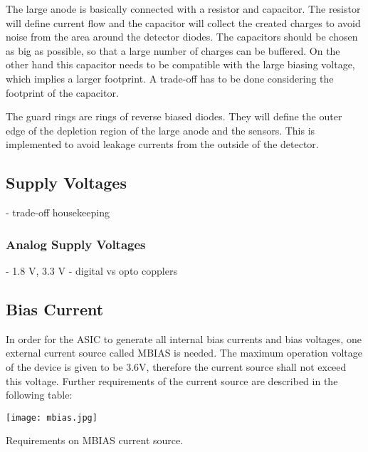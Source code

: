 The large anode is basically connected with a resistor and capacitor.
The resistor will define current flow and the capacitor will collect the created charges to avoid noise from the area around the detector diodes.
The capacitors should be chosen as big as possible, so that a large number of charges can be buffered.
On the other hand this capacitor needs to be compatible with the large biasing voltage, which implies a larger footprint.
A trade-off has to be done considering the footprint of the capacitor.

The guard rings are rings of reverse biased diodes.
They will define the outer edge of the depletion region of the large anode and the sensors.
This is implemented to avoid leakage currents from the outside of the detector.


\subsection{Supply Voltages}
\label{sec:power_supplies}
- trade-off housekeeping

\subsubsection{Analog Supply Voltages}
\label{sec:analog_supply}
- 1.8 V, 3.3 V
- digital vs opto copplers

\subsection{Bias Current}
\label{sec:bias_current}
In order for the ASIC to generate all internal bias currents and bias voltages, one external current source called MBIAS is needed.
The maximum operation voltage of the device is given to be 3.6V, therefore the current source shall not exceed this voltage.
Further requirements of the current source are described in the following table:\cite[p. 64-65]{Meier2016VATA466}
\begin{table}[H]
	\centering
    \texttt{[image: mbias.jpg]}
    \caption[MBIAS Parameters]{Requirements on MBIAS current source.\cite[p. 65, tab. 30]{Meier2016VATA466}}
	\label{tab:mbias}
\end{table}

